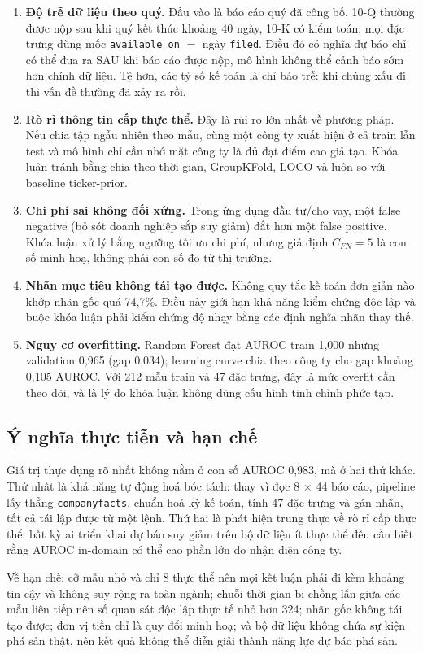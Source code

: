 \begin{enumerate}
\item \textbf{Độ trễ dữ liệu theo quý.} Đầu vào là báo cáo quý đã công bố. 10-Q thường được nộp
      sau khi quý kết thúc khoảng 40 ngày, 10-K có kiểm toán; mọi đặc trưng dùng mốc
      \texttt{available\_on} $=$ ngày \texttt{filed}. Điều đó có nghĩa dự báo chỉ có thể đưa ra SAU
      khi báo cáo được nộp, mô hình không thể cảnh báo sớm hơn chính dữ liệu. Tệ hơn, các tỷ số kế
      toán là chỉ báo trễ: khi chúng xấu đi thì vấn đề thường đã xảy ra rồi.
\item \textbf{Rò rỉ thông tin cấp thực thể.} Đây là rủi ro lớn nhất về phương pháp. Nếu chia tập
      ngẫu nhiên theo mẫu, cùng một công ty xuất hiện ở cả train lẫn test và mô hình chỉ cần nhớ
      mặt công ty là đủ đạt điểm cao giả tạo. Khóa luận tránh bằng chia theo thời gian, GroupKFold,
      LOCO và luôn so với baseline ticker-prior.
\item \textbf{Chi phí sai không đối xứng.} Trong ứng dụng đầu tư/cho vay, một false negative (bỏ
      sót doanh nghiệp sắp suy giảm) đắt hơn một false positive. Khóa luận xử lý bằng ngưỡng tối ưu
      chi phí, nhưng giả định $C_{FN} = 5$ là con số minh hoạ, không phải con số đo từ thị trường.
\item \textbf{Nhãn mục tiêu không tái tạo được.} Không quy tắc kế toán đơn giản nào khớp nhãn gốc
      quá 74,7\%. Điều này giới hạn khả năng kiểm chứng độc lập và buộc khóa luận phải kiểm chứng
      độ nhạy bằng các định nghĩa nhãn thay thế.
\item \textbf{Nguy cơ overfitting.} Random Forest đạt AUROC train 1,000 nhưng validation 0,965
      (gap 0,034); learning curve chia theo công ty cho gap khoảng 0,105 AUROC. Với 212 mẫu train và
      47 đặc trưng, đây là mức overfit cần theo dõi, và là lý do khóa luận không dùng cấu hình tinh
      chỉnh phức tạp.
\end{enumerate}

\subsection{Ý nghĩa thực tiễn và hạn chế}

Giá trị thực dụng rõ nhất không nằm ở con số AUROC 0,983, mà ở hai thứ khác. Thứ nhất là khả năng tự
động hoá bóc tách: thay vì đọc 8 $\times$ 44 báo cáo, pipeline lấy thẳng \texttt{companyfacts},
chuẩn hoá kỳ kế toán, tính 47 đặc trưng và gán nhãn, tất cả tái lập được từ một lệnh. Thứ hai là
phát hiện trung thực về rò rỉ cấp thực thể: bất kỳ ai triển khai dự báo suy giảm trên bộ dữ liệu ít
thực thể đều cần biết rằng AUROC in-domain có thể cao phần lớn do nhận diện công ty.

Về hạn chế: cỡ mẫu nhỏ và chỉ 8 thực thể nên mọi kết luận phải đi kèm khoảng tin cậy và không suy
rộng ra toàn ngành; chuỗi thời gian bị chồng lấn giữa các mẫu liên tiếp nên số quan sát độc lập thực
tế nhỏ hơn 324; nhãn gốc không tái tạo được; đơn vị tiền chỉ là quy đổi minh hoạ; và bộ dữ liệu
không chứa sự kiện phá sản thật, nên kết quả không thể diễn giải thành năng lực dự báo phá sản.



